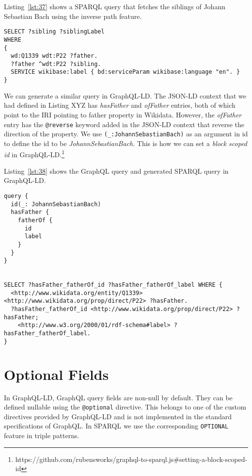 Listing~\ref{lst:37} shows a SPARQL query that fetches the siblings of Johann Sebastian Bach using the inverse path feature.

\begin{minipage}{\linewidth}
\begin{lstlisting}[label=lst:37, caption={SPARQL query showing usage of inverse path}, language=SPARQL]
SELECT ?sibling ?siblingLabel
WHERE
{
  wd:Q1339 wdt:P22 ?father.
  ?father ^wdt:P22 ?sibling.
  SERVICE wikibase:label { bd:serviceParam wikibase:language "en". }
}
\end{lstlisting}
\end{minipage}

We can generate a similar query in GraphQL-LD. The JSON-LD context that we had defined in Listing XYZ has \textit{hasFather} and \textit{ofFather} entries, both of which point to the IRI pointing to father property in Wikidata. However, the \textit{ofFather} entry has the \texttt{@reverse} keyword added in the JSON-LD context that reverse the direction of the property. We use \texttt{(\_:JohannSebastianBach)} as an argument in id to define the id to be \textit{JohannSebastianBach}. This is how we can set a \textit{block scoped id} in GraphQL-LD.\footnote{https://github.com/rubensworks/graphql-to-sparql.js\#setting-a-block-scoped-id}

Listing~\ref{lst:38} shows the GraphQL query and generated SPARQL query in GraphQL-LD.

\begin{minipage}{\linewidth}
\begin{lstlisting}[columns=fullflexible, label=lst:38, caption={GraphQL query and generated SPARQL query in GraphQL-LD}, language=SPARQL]
query {
  id(_: JohannSebastianBach)
  hasFather {
  	fatherOf {
  	  id
      label
    }
  }
}


SELECT ?hasFather_fatherOf_id ?hasFather_fatherOf_label WHERE {
  <http://www.wikidata.org/entity/Q1339> <http://www.wikidata.org/prop/direct/P22> ?hasFather.
  ?hasFather_fatherOf_id <http://www.wikidata.org/prop/direct/P22> ?hasFather;
    <http://www.w3.org/2000/01/rdf-schema#label> ?hasFather_fatherOf_label.
}
\end{lstlisting}
\end{minipage}


\section{Optional Fields}

In GraphQL-LD, GraphQL query fields are non-null by default. They can be defined nullable using the \texttt{@optional} directive. This belongs to one of the custom directives provided by GraphQL-LD and is not implemented in the standard specifications of GraphQL. In SPARQL we use the corresponding \texttt{OPTIONAL} feature in triple patterns.

